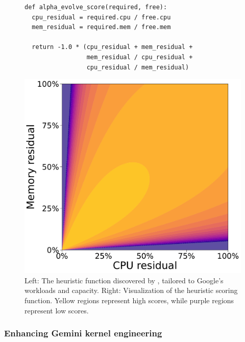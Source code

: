 \begin{figure}[t]
\centering

\begin{minipage}[c]{0.55\textwidth}
\centering
\begin{verbatim}
def alpha_evolve_score(required, free):
  cpu_residual = required.cpu / free.cpu
  mem_residual = required.mem / free.mem

  return -1.0 * (cpu_residual + mem_residual +
                 mem_residual / cpu_residual +
                 cpu_residual / mem_residual)
\end{verbatim}
\end{minipage}
\hfill
\begin{minipage}[c]{0.4\textwidth}
    \includegraphics[width=1.0\textwidth]{figures/borg_heuristic.pdf}
\end{minipage}

\caption{Left: The heuristic function discovered by \method, tailored to Google’s workloads and capacity. Right: Visualization of the heuristic scoring function. Yellow regions represent high scores, while purple regions represent low scores.}
\label{fig:alphaevolve_heuristic}
\end{figure}


\subsubsection{Enhancing Gemini kernel engineering}

